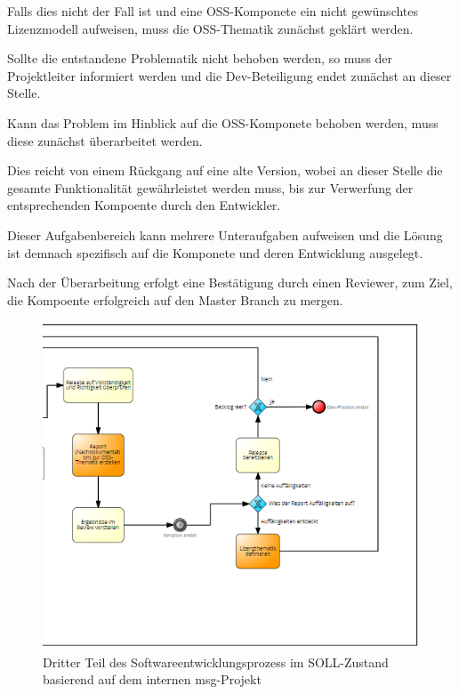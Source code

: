 Falls dies nicht der Fall ist und eine OSS-Komponete ein nicht gewünschtes Lizenzmodell aufweisen, muss die OSS-Thematik zunächst geklärt werden.

Sollte die entstandene Problematik nicht behoben werden, so muss der Projektleiter informiert werden und die Dev-Beteiligung endet zunächst an dieser Stelle. 

Kann das Problem im Hinblick auf die OSS-Komponete behoben werden, muss diese zunächst überarbeitet werden. 

Dies reicht von einem Rückgang auf eine alte Version, wobei an dieser Stelle die gesamte Funktionalität gewährleistet werden muss, bis zur Verwerfung der entsprechenden Kompoente durch den Entwickler. 

Dieser Aufgabenbereich kann mehrere Unteraufgaben aufweisen und die Lösung ist demnach spezifisch auf die Komponete und deren Entwicklung ausgelegt. 

Nach der Überarbeitung erfolgt eine Bestätigung durch einen Reviewer, zum Ziel, die Kompoente erfolgreich auf den Master Branch zu mergen. 

\begin{figure}[h]
    \centering
    \includegraphics[scale=0.5]{Bilder/SOLL-Prozess_third Part.png}
    \caption{Dritter Teil des Softwareentwicklungsprozess im SOLL-Zustand basierend auf dem internen msg-Projekt}
\end{figure}

